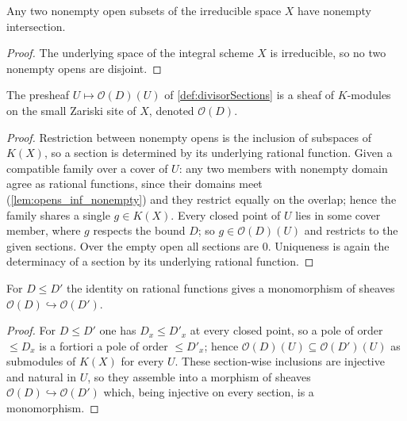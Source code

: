 \begin{lemma}
  \label{lem:opens_inf_nonempty}
  \leanok
  Any two nonempty open subsets of the irreducible space \(X\) have nonempty intersection.
\end{lemma}
\begin{proof}
  \leanok
  The underlying space of the integral scheme \(X\) is irreducible, so no two nonempty opens are
  disjoint.
\end{proof}

\begin{definition}
  \label{def:divisorSheaf}
  \leanok
  The presheaf \(U \mapsto \mathcal O(D)(U)\) of \ref{def:divisorSections} is a sheaf of
  \(K\)-modules on the small Zariski site of \(X\), denoted \(\mathcal O(D)\).
\end{definition}
\begin{proof}
  \leanok
  Restriction between nonempty opens is the inclusion of subspaces of \(K(X)\), so a section is
  determined by its underlying rational function. Given a compatible family over a cover of \(U\):
  any two members with nonempty domain agree as rational functions, since their domains meet
  (\ref{lem:opens_inf_nonempty}) and they restrict equally on the overlap; hence the family shares a
  single \(g \in K(X)\). Every closed point of \(U\) lies in some cover member, where \(g\) respects
  the bound \(D\); so \(g \in \mathcal O(D)(U)\) and restricts to the given sections. Over the empty
  open all sections are \(0\). Uniqueness is again the determinacy of a section by its underlying
  rational function.
\end{proof}

\begin{theorem}
  \label{thm:divisorSheafLE}
  \leanok
  For \(D \le D'\) the identity on rational functions gives a monomorphism of sheaves
  \(\mathcal O(D) \hookrightarrow \mathcal O(D')\).
\end{theorem}
\begin{proof}
  \leanok
  For \(D \le D'\) one has \(D_x \le D'_x\) at every closed point, so a pole of order \(\le D_x\) is
  a fortiori a pole of order \(\le D'_x\); hence \(\mathcal O(D)(U) \subseteq \mathcal O(D')(U)\) as
  submodules of \(K(X)\) for every \(U\). These section-wise inclusions are injective and natural in
  \(U\), so they assemble into a morphism of sheaves \(\mathcal O(D) \hookrightarrow \mathcal O(D')\)
  which, being injective on every section, is a monomorphism.
\end{proof}

